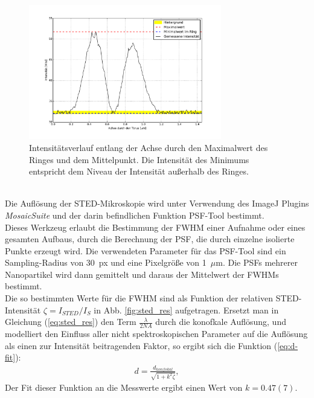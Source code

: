 \begin{figure}
	\centering
	\includegraphics[width=0.75\textwidth]{plots/doughnut.pdf}
	\caption{Intensitätsverlauf entlang der Achse durch den Maximalwert des Ringes und dem Mittelpunkt.
	Die Intensität des Minimums entspricht dem Niveau der Intensität außerhalb des Ringes.}
	\label{fig:doughnut}
\end{figure}
\\ 
Die Auflösung der STED-Mikroskopie wird unter Verwendung des ImageJ Plugins \emph{MosaicSuite} und der darin befindlichen Funktion PSF-Tool bestimmt.\\
Dieses Werkzeug erlaubt die Bestimmung der FWHM einer Aufnahme oder eines gesamten Aufbaus, durch die Berechnung der PSF, die durch einzelne isolierte Punkte erzeugt wird.
Die verwendeten Parameter für das PSF-Tool sind ein Sampling-Radius von 30~px und eine Pixelgröße von 1~$\mu$m.
Die PSFs mehrerer Nanopartikel wird dann gemittelt und daraus der Mittelwert der FWHMs bestimmt.
\\
Die so bestimmten Werte für die FWHM sind als Funktion der relativen STED-Intensität $\zeta = I_{STED}/I_S$ in Abb. \ref{fig:sted_res} aufgetragen.
Ersetzt man in Gleichung (\ref{eq:sted_res}) den Term $\frac{\lambda}{2NA}$ durch die konofkale Auflösung, und modelliert den Einfluss aller nicht spektroskopischen Parameter auf die Auflösung als einen zur Intensität beitragenden Faktor, so ergibt sich die Funktion (\ref{eq:d-fit}):
\begin{align}
	d = \frac{d_{konfokal}}{\sqrt{1+k^2\zeta}}, \label{eq:d-fit}
\end{align}
Der Fit dieser Funktion an die Messwerte ergibt einen Wert von $k=0.47(7)$.
